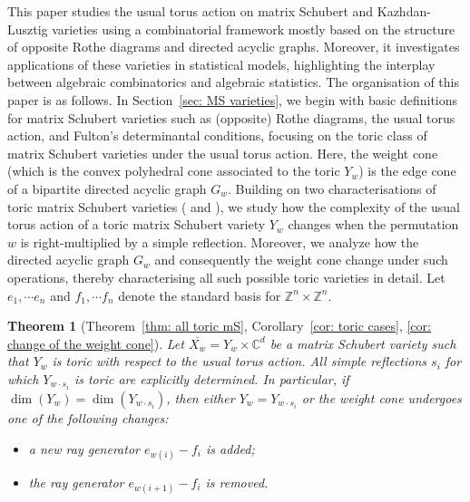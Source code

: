 \documentclass[11pt]{amsart}
\newtheorem{theorem}{Theorem}[section]
\theoremstyle{definition}
\theoremstyle{definition}
\theoremstyle{definition}
\theoremstyle{definition}
\begin{document}
This paper studies the usual torus action on matrix Schubert and Kazhdan-Lusztig varieties using a combinatorial framework mostly based on the structure of opposite Rothe diagrams and directed acyclic graphs. Moreover, it investigates applications of these varieties in statistical models, highlighting the interplay between algebraic combinatorics and algebraic statistics. The organisation of this paper is as follows. In Section~\ref{sec: MS varieties}, we begin with basic definitions for matrix Schubert varieties such as (opposite) Rothe diagrams, the usual torus action, and Fulton's determinantal conditions, focusing on the toric class of matrix Schubert varieties under the usual torus action. Here, the weight cone (which is the convex polyhedral cone associated to the toric $Y_w$) is the edge cone of a bipartite directed acyclic graph $G_w$. Building on two characterisations of toric matrix Schubert varieties (\cite[Theorem~1.6]{stelzer2025matrix} and \cite[Theorem~3.4]{escobar2016toric}), we study how the complexity of the usual torus action of a toric matrix Schubert variety $Y_w$ changes when the permutation $w$ is right-multiplied by a simple reflection. Moreover, we analyze how the directed acyclic graph $G_w$ and consequently the weight cone change under such operations, thereby characterising all such possible toric varieties in detail. Let $e_1, \cdots e_n$ and $f_1, \cdots f_n$ denote the standard basis for $\mathbb Z^n \times \mathbb Z^n$.

\begin{theorem}[{Theorem~\ref{thm: all toric mS}, Corollary~\ref{cor: toric cases}, \ref{cor: change of the weight cone}}]
   Let $\overline{X_w} = Y_w \times \mathbb{C}^d$ be a matrix Schubert variety such that $Y_w$ is toric with respect to the usual torus action. All simple reflections $s_i$ for which $Y_{w \cdot s_i}$ is toric are explicitly determined. In particular, if $\dim(Y_w) = \dim(Y_{w \cdot s_i})$, then either $Y_w = Y_{w \cdot s_i}$ or the weight cone undergoes one of the following changes:
   \begin{itemize}
       \item a new ray generator $e_{w(i)} - f_{i}$ is added;
       \item the ray generator $e_{w(i+1)} - f_{i}$ is removed.
   \end{itemize}
\end{theorem}
\end{document}
